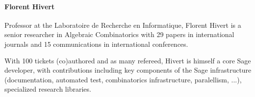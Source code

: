 \paragraph{Florent Hivert}

%

%



Professor at the Laboratoire de Recherche en Informatique, Florent
Hivert is a senior researcher in Algebraic Combinatorics with 29
papers in international journals and 15 communications in
international conferences.

With 100 tickets (co)authored and as many refereed, Hivert is himself a core
Sage developer, with contributions including key components of the Sage
infrastructure (documentation, automated test, combinatorics infrastructure,
paralellism, ...), specialized research libraries.
